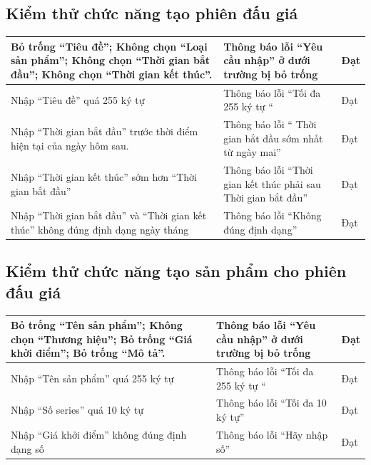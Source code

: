 \documentclass[../DoAn.tex]{subfiles}
\begin{document}
\subsection{Kiểm thử chức năng tạo phiên đấu giá}
    \tabletail{\hline}
    \label{bang413}
    \begin{supertabular}{| p{.45\textwidth}|p{.30\textwidth}|p{.15\textwidth}|} 
    \hline
        Bỏ trống “Tiêu đề”;
        Không chọn “Loại sản phẩm”;
        Không chọn “Thời gian bắt đầu”;
        Không chọn  “Thời gian kết thúc”.
        & Thông báo lỗi “Yêu cầu nhập” ở dưới trường bị bỏ trống&Đạt \\\hline
        Nhập “Tiêu đề” quá 255 ký tự
        & Thông báo lỗi “Tối đa 255 ký tự “&Đạt \\\hline
        Nhập “Thời gian bắt đầu” trước thời điểm hiện tại của ngày hôm sau.
        & Thông báo lỗi “ Thời gian bắt đầu sớm nhất từ ngày mai”&Đạt \\\hline
        Nhập “Thời gian kết thúc” sớm hơn “Thời gian bắt đầu”
        & Thông báo lỗi “Thời gian kết thúc phải sau Thời gian bắt đầu”&Đạt \\\hline
        Nhập “Thời gian bắt đầu” và “Thời gian kết thúc” không đúng định dạng ngày tháng
        & Thông báo lỗi “Không đúng định dạng”&Đạt \\\hline
    \end{supertabular}
\subsection{Kiểm thử chức năng tạo sản phẩm cho phiên đấu giá}
    \tabletail{\hline}
    \label{bang414}
    \begin{supertabular}{| p{.45\textwidth}|p{.30\textwidth}|p{.15\textwidth}|} 
    \hline
        Bỏ trống “Tên sản phẩm”;
        Không chọn “Thương hiệu”;
        Bỏ trống “Giá khởi điểm”;
        Bỏ trống “Mô tả”.
        & Thông báo lỗi “Yêu cầu nhập” ở dưới trường bị bỏ trống&Đạt \\\hline
        Nhập “Tên sản phẩm” quá 255 ký tự
        & Thông báo lỗi “Tối đa 255 ký tự “&Đạt \\\hline
        Nhập “Số series” quá 10 ký tự
        & Thông báo lỗi “Tối đa 10 ký tự”&Đạt \\\hline
        Nhập “Giá khởi điểm” không đúng định dạng số
        & Thông báo lỗi “Hãy nhập số”&Đạt \\\hline
    \end{supertabular}
\end{document}

